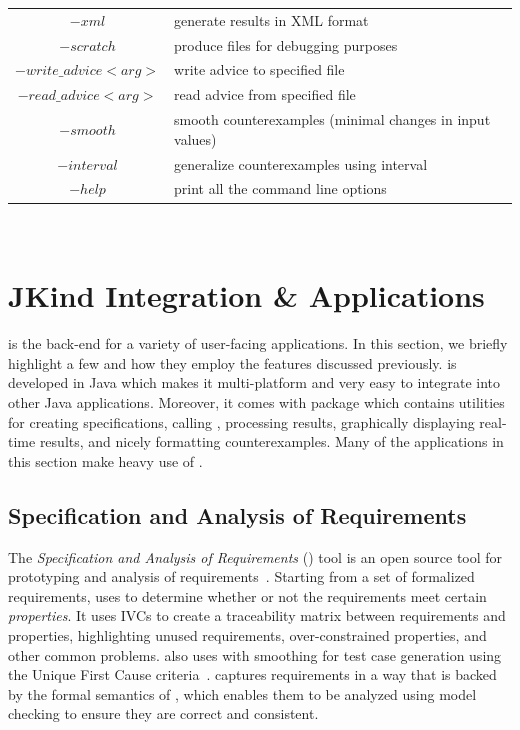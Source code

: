 \begin{table}
\begin{tabularx}{\linewidth}{|c|L|}
  $-xml$ & generate results in XML format\\[0.5ex]
  $-scratch$ & produce files for debugging purposes\\[0.5ex]\hline
    $-write\_advice <arg>$ & write advice to specified file\\[0.5ex]
  $ -read\_advice <arg>$ & read advice from specified file \\[0.5ex]\hline
    $-smooth$ & smooth counterexamples (minimal changes in  input values)\\[0.5ex]
    $-interval$ & generalize counterexamples using interval\\[0.5ex]\hline
  $-help$ & print all the command line options \\[0.5ex]
  \hline
\end{tabularx}\\
\label{tab:jkindcm}
\end{table}




\section{ {\sc JKind} Integration \& Applications}


\jkind is the back-end for a variety of user-facing applications. In this section, we briefly highlight a few and how they employ the features discussed previously.
%
\jkind  is developed in Java which makes it multi-platform and very easy to
integrate into other Java applications. Moreover, it comes with
\jkindapi package which contains utilities for creating \lustre
specifications, calling \jkind, processing \jkind results, graphically
displaying real-time results, and nicely formatting counterexamples.
Many of the applications in this section make heavy use of \jkindapi.
%

\subsection{Specification and Analysis of Requirements}

The {\em Specification and Analysis of Requirements} (\spear) tool is an open source tool for prototyping and analysis of requirements~\cite{fifarek2017nfm}.  Starting from a set of formalized requirements, \spear uses \jkind to determine whether or not the requirements meet certain {\em properties}.  It uses IVCs to create a traceability matrix between requirements and properties, highlighting unused requirements, over-constrained properties, and other common problems. \spear also uses \jkind with smoothing for test case generation using the Unique First Cause criteria~\cite{whalen2006issta}.
%
\spear captures
requirements in a way that is backed by the formal semantics of
\lustre, which enables them to be analyzed using model checking to
ensure they are correct and consistent.


